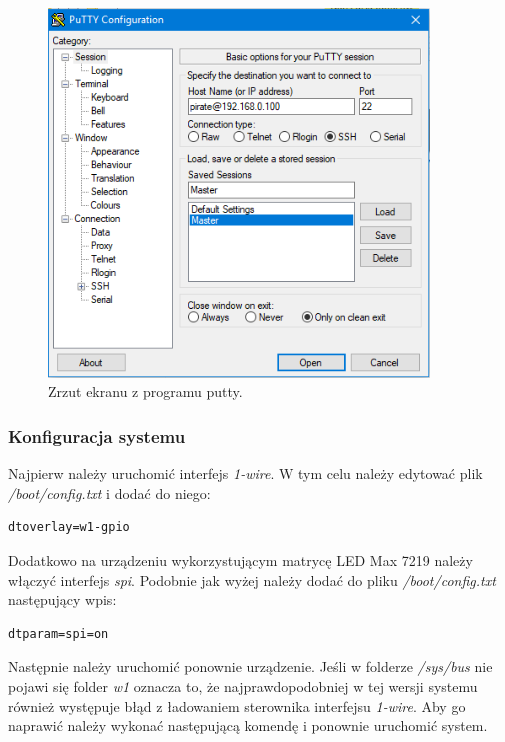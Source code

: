 \documentclass[12pt]{report}
\let\Oldsubsubsection\subsubsection
\renewcommand{\subsubsection}{\FloatBarrier\Oldsubsubsection}
\begin{document}
{\begin{figure}[h]
	\centering
	\includegraphics[width=0.9\textwidth]{images/putty.png}
	\caption{Zrzut ekranu z programu putty.}
\end{figure}
\FloatBarrier

\subsubsection{Konfiguracja systemu}
Najpierw należy uruchomić interfejs \textit{1-wire}. W tym celu należy edytować plik \textit{/boot/config.txt} i dodać do niego:

\begin{lstlisting}
dtoverlay=w1-gpio
\end{lstlisting}

Dodatkowo na urządzeniu wykorzystującym matrycę LED Max 7219 należy włączyć interfejs \textit{spi}. Podobnie jak wyżej należy dodać do pliku \textit{/boot/config.txt} następujący wpis:

\begin{lstlisting}
dtparam=spi=on
\end{lstlisting}

Następnie należy uruchomić ponownie urządzenie. Jeśli w folderze \textit{/sys/bus} nie pojawi się folder \textit{w1} oznacza to, że najprawdopodobniej w tej wersji systemu również występuje błąd z ładowaniem sterownika interfejsu \textit{1-wire}. Aby go naprawić należy wykonać następującą komendę i ponownie uruchomić system.

}
\end{document}
